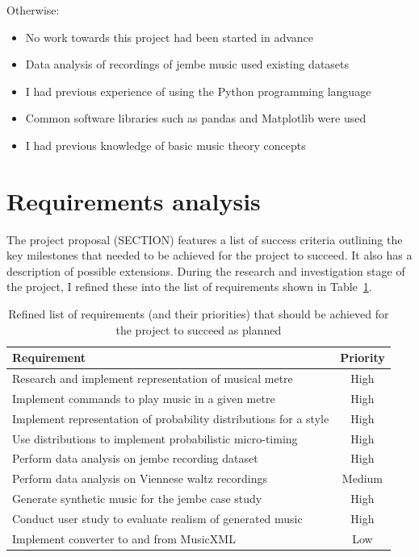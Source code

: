 \documentclass[12pt,twoside,openright]{report}
\begin{document}
Otherwise:
\begin{itemize}
	\item No work towards this project had been started in advance
	\item Data analysis of recordings of jembe music used existing datasets
	\item I had previous experience of using the Python programming language
	\item Common software libraries such as pandas and Matplotlib were used
	\item I had previous knowledge of basic music theory concepts
\end{itemize}



\section{Requirements analysis} \label{requirements_analysis}

The project proposal (SECTION) features a list of success criteria outlining the
key milestones that needed to be achieved for the project to succeed. It also
has a description of possible extensions. During the research and investigation
stage of the project, I refined these into the list of requirements shown in
Table~\ref{table:requirements}.

\begin{table}
\centering
\begin{tabular}{|l|c|}
    \hline
    \textbf{Requirement}                                      & \textbf{Priority} \\
    \hline
    Research and implement representation of musical metre              & High \\
    Implement commands to play music in a given metre                   & High \\
    Implement representation of probability distributions for a style   & High \\
    Use distributions to implement probabilistic micro-timing           & High \\
    Perform data analysis on jembe recording dataset                    & High \\
    Perform data analysis on Viennese waltz recordings                  & Medium \\
    Generate synthetic music for the jembe case study                   & High \\
    Conduct user study to evaluate realism of generated music           & High \\
    Implement converter to and from MusicXML                            & Low \\
    \hline
\end{tabular}
\caption{Refined list of requirements (and their priorities) that should be achieved for the project to succeed as planned}
\label{table:requirements}
\end{table}
\end{document}
